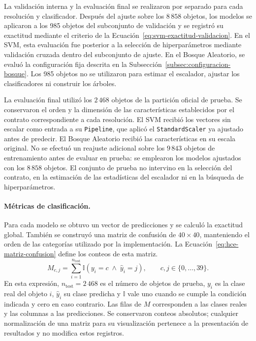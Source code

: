 La validación interna y la evaluación final se realizaron por separado para cada resolución y clasificador. Después del ajuste sobre los $8\,858$ objetos, los modelos se aplicaron a los 985 objetos del subconjunto de validación y se registró su exactitud mediante el criterio de la Ecuación~\eqref{eq:svm-exactitud-validacion}. En el SVM, esta evaluación fue posterior a la selección de hiperparámetros mediante validación cruzada dentro del subconjunto de ajuste. En el Bosque Aleatorio, se evaluó la configuración fija descrita en la Subsección~\ref{subsec:configuracion-bosque}. Los 985 objetos no se utilizaron para estimar el escalador, ajustar los clasificadores ni construir los árboles.

La evaluación final utilizó los $2\,468$ objetos de la partición oficial de prueba. Se conservaron el orden y la dimensión de las características establecidos por el contrato correspondiente a cada resolución. El SVM recibió los vectores sin escalar como entrada a su \texttt{Pipeline}, que aplicó el \texttt{StandardScaler} ya ajustado antes de predecir. El Bosque Aleatorio recibió las características en su escala original. No se efectuó un reajuste adicional sobre los $9\,843$ objetos de entrenamiento antes de evaluar en prueba: se emplearon los modelos ajustados con los $8\,858$ objetos. El conjunto de prueba no intervino en la selección del contrato, en la estimación de las estadísticas del escalador ni en la búsqueda de hiperparámetros.

\paragraph{Métricas de clasificación.}

Para cada modelo se obtuvo un vector de predicciones y se calculó la exactitud global. También se construyó una matriz de confusión de $40\times40$, manteniendo el orden de las categorías utilizado por la implementación. La Ecuación~\eqref{eq:hce-matriz-confusion} define los conteos de esta matriz.
\begin{equation}
M_{c,j}=\sum_{i=1}^{n_{\mathrm{test}}}
\mathbb{I}\!\left(y_i=c\;\land\;\widehat y_i=j\right),
\qquad c,j\in\{0,\ldots,39\}.
\label{eq:hce-matriz-confusion}
\end{equation}
En esta expresión, $n_{\mathrm{test}}=2\,468$ es el número de objetos de prueba, $y_i$ es la clase real del objeto $i$, $\widehat y_i$ su clase predicha y $\mathbb{I}$ vale uno cuando se cumple la condición indicada y cero en caso contrario. Las filas de $M$ corresponden a las clases reales y las columnas a las predicciones. Se conservaron conteos absolutos; cualquier normalización de una matriz para su visualización pertenece a la presentación de resultados y no modifica estos registros.

